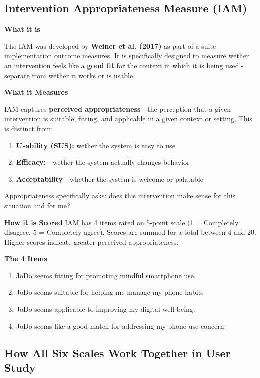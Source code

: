 \documentclass[12pt]{article}
\begin{document}
\subsection{Intervention Appropriateness Measure (IAM)}

\textbf{What it is}

The IAM was developed by \textbf{Weiner et al. (2017)} as part of a suite implementation outcome measures. It is specifically designed to measure wether an intervention feels like a \textbf{good fit} for the context in which it is being used - separate from wether it works or is usable.


\textbf{What it Measures}

IAM captures \textbf{perceived appropriateness} - the perception that a given intervention is suitable, fitting, and applicable in a given context or setting, This is distinct from: 
\begin{enumerate}
    \item \textbf{Usability (SUS):} wether the system is easy to use
    \item \textbf{Efficacy:} - wether the system actually changes behavior
    \item \textbf{Acceptability} - whether the system is welcome or palatable
\end{enumerate}

Appropriateness specifically asks: does this intervention make sense for this situation and for me?

\textbf{How it is Scored}
IAM has 4 items rated on 5-point scale (1 = Completely disagree, 5 = Completely agree).
Scores are summed for a total between 4 and 20. Higher scores indicate greater perceived appropriateness.


\textbf{The 4 Items}
\begin{enumerate}
    \item JoDo seems fitting for promoting mindful smartphone use
    \item JoDo seems suitable for helping me manage my phone habits
    \item JoDo seems applicable to improving my digital well-being.
    \item JoDo seems like a good match for addressing my phone use concern.
\end{enumerate}

\subsection{How All Six Scales Work Together in User Study}
\end{document}
